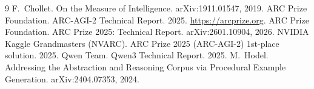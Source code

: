 \documentclass[11pt]{article}
\begin{document}
\begin{thebibliography}{9}
 F.~Chollet. On the Measure of Intelligence. arXiv:1911.01547, 2019.
 ARC Prize Foundation. ARC-AGI-2 Technical Report. 2025. \url{https://arcprize.org}.
 ARC Prize Foundation. ARC Prize 2025: Technical Report. arXiv:2601.10904, 2026.
 NVIDIA Kaggle Grandmasters (NVARC). ARC Prize 2025 (ARC-AGI-2) 1st-place solution. 2025.
 Qwen Team. Qwen3 Technical Report. 2025.
 M.~Hodel. Addressing the Abstraction and Reasoning Corpus via Procedural Example
Generation. arXiv:2404.07353, 2024.
\end{thebibliography}
\end{document}
